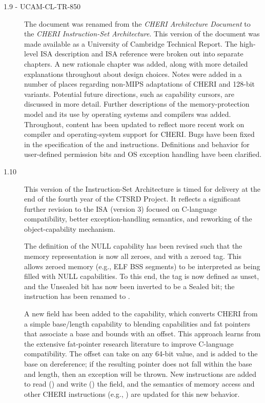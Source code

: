 \begin{description}
\item[1.9 - UCAM-CL-TR-850]
  The document was renamed from the {\em CHERI Architecture Document} to the
  {\em CHERI Instruction-Set Architecture}.
  This version of the document was made available as a University of Cambridge
  Technical Report.
  The high-level ISA description and ISA reference were broken out into
  separate chapters.
  A new rationale chapter was added, along with more detailed explanations
  throughout about design choices.
  Notes were added in a number of places regarding non-MIPS adaptations of
  CHERI and 128-bit variants.
  Potential future directions, such as capability cursors, are discussed in
  more detail.
  Further descriptions of the memory-protection model and its use by operating
  systems and compilers was added.
  Throughout, content has been updated to reflect more recent work on compiler
  and operating-system support for CHERI.
  Bugs have been fixed in the specification of the  and
   instructions.
  Definitions and behavior for user-defined permission bits and OS exception
  handling have been clarified.

\item[1.10]
  This version of the Instruction-Set Architecture is timed for delivery at
  the end of the fourth year of the CTSRD Project.  It reflects a significant
  further revision to the ISA (version 3) focused on C-language compatibility,
  better exception-handling semantics, and reworking of the object-capability
  mechanism.

  The definition of the NULL capability has been revised such that the memory
  representation is now all zeroes, and with a zeroed tag.  This allows
  zeroed memory (e.g., ELF BSS segments) to be interpreted as being filled
  with NULL capabilities.  To this end, the tag is now defined as unset, and
  the Unsealed bit has now been inverted to be a Sealed bit; the
   instruction has been renamed to
  .

  A new \coffset{} field has been added to the capability, which converts CHERI
  from a simple base/length capability to blending capabilities and fat
  pointers that associate a base and bounds with an offset.
  This approach learns from the extensive fat-pointer research literature to
  improve C-language compatibility.
  The offset can take on any 64-bit value, and is added to the base on
  dereference; if the resulting pointer does not fall within the base and
  length, then an exception will be thrown.
  New instructions are added to read () and write
  () the
  field, and the semantics of memory access and other CHERI instructions
  (e.g., ) are updated for this new behavior.


\end{description}
